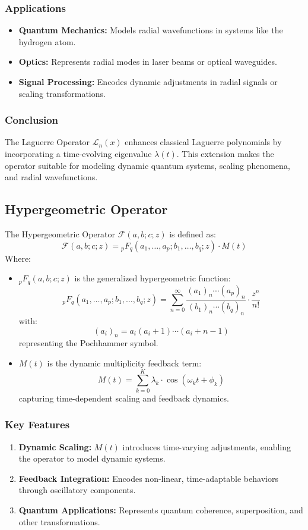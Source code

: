 \documentclass{article}
\theoremstyle{plain}
\begin{document}
\subsubsection*{Applications}
\begin{itemize}
    \item \textbf{Quantum Mechanics:} Models radial wavefunctions in systems like the hydrogen atom.
    \item \textbf{Optics:} Represents radial modes in laser beams or optical waveguides.
    \item \textbf{Signal Processing:} Encodes dynamic adjustments in radial signals or scaling transformations.
\end{itemize}

\subsubsection*{Conclusion}
The Laguerre Operator \( \mathcal{L}_n(x) \) enhances classical Laguerre polynomials by incorporating a time-evolving eigenvalue \( \lambda(t) \). This extension makes the operator suitable for modeling dynamic quantum systems, scaling phenomena, and radial wavefunctions.


\subsection{Hypergeometric Operator}

The Hypergeometric Operator \( \mathcal{F}(a, b; c; z) \) is defined as:
\[
\mathcal{F}(a, b; c; z) = {}_pF_q(a_1, \dots, a_p; b_1, \dots, b_q; z) \cdot M(t)
\]
Where:
\begin{itemize}
    \item \( {}_pF_q(a, b; c; z) \) is the generalized hypergeometric function:
    \[
    {}_pF_q(a_1, \dots, a_p; b_1, \dots, b_q; z) = \sum_{n=0}^\infty \frac{(a_1)_n \cdots (a_p)_n}{(b_1)_n \cdots (b_q)_n} \cdot \frac{z^n}{n!}
    \]
    with:
    \[
    (a_i)_n = a_i (a_i + 1) \cdots (a_i + n - 1)
    \]
    representing the Pochhammer symbol.
    \item \( M(t) \) is the dynamic multiplicity feedback term:
    \[
    M(t) = \sum_{k=0}^K \lambda_k \cdot \cos(\omega_k t + \phi_k)
    \]
    capturing time-dependent scaling and feedback dynamics.
\end{itemize}

\subsubsection*{Key Features}
\begin{enumerate}
    \item \textbf{Dynamic Scaling:} \( M(t) \) introduces time-varying adjustments, enabling the operator to model dynamic systems.
    \item \textbf{Feedback Integration:} Encodes non-linear, time-adaptable behaviors through oscillatory components.
    \item \textbf{Quantum Applications:} Represents quantum coherence, superposition, and other transformations.
\end{enumerate}
\end{document}
